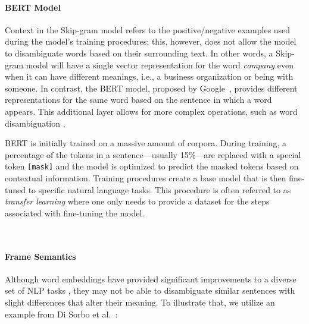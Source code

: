 



\paragraph{\textbf{BERT Model}}
\label{cp5:bert}

Context in the Skip-gram model refers to the positive/negative examples used during the model's training procedures; this, however, does not allow the model to disambiguate words based on their surrounding text. In other words, a Skip-gram model will have a single vector representation for the word \textit{company} even when it can have different meanings, i.e., a business organization or being with someone. In contrast, 
the \acf{BERT} model, proposed by Google~\cite{Devlin2018Bert}, provides different representations for the same word based on the sentence in which a word appears.
This additional layer allows for more complex operations, such as word disambiguation .


BERT is initially trained 
on a massive amount of corpora. During training, a percentage of the tokens in a sentence---usually 15\%---are replaced with a special token \texttt{[mask]} and the model is optimized to predict the masked tokens based on contextual information. 
Training procedures create a base model that is then fine-tuned to specific natural language tasks. This procedure is often referred to as \textit{transfer learning}  where one only needs to provide a dataset for the steps associated with fine-tuning the model. 

~\cite{Lin2021}
~\cite{Araujo2021}




\paragraph{\textbf{Frame Semantics}}
\label{cp5:frame-semantics}


Although word embeddings have provided significant improvements to a diverse set of NLP tasks , they may not be able to disambiguate similar sentences with slight differences that alter their meaning. To illustrate that, we utilize an example
from Di Sorbo et al.~\cite{Sorbo2015}:

